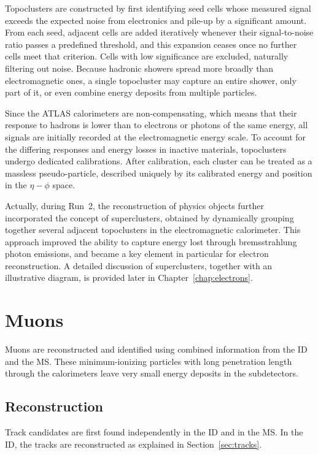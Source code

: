 Topoclusters are constructed by first identifying seed cells whose measured signal exceeds the expected noise from electronics and pile-up by a significant amount. From each seed, adjacent cells are added iteratively whenever their signal-to-noise ratio passes a predefined threshold, and this expansion ceases once no further cells meet that criterion. Cells with low significance are excluded, naturally filtering out noise. Because hadronic showers spread more broadly than electromagnetic ones, a single topocluster may capture an entire shower, only part of it, or even combine energy deposits from multiple particles. 

Since the ATLAS calorimeters are non-compensating, which means that their response to hadrons is lower than to electrons or photons of the same energy, all signals are initially recorded at the electromagnetic energy scale. To account for the differing responses and energy losses in inactive materials, topoclusters undergo dedicated calibrations. After calibration, each cluster can be treated as a massless pseudo-particle, described uniquely by its calibrated energy and position in the $\eta - \phi$ space. 

Actually, during Run~2, the reconstruction of physics objects further incorporated the concept of superclusters, obtained by dynamically grouping together several adjacent topoclusters in the electromagnetic calorimeter. This approach improved the ability to capture energy lost through bremsstrahlung photon emissions, and became a key element in particular for electron reconstruction. A detailed discussion of superclusters, together with an illustrative diagram, is provided later in Chapter~\ref{chap:electrons}.

\section{Muons}
\label{sec:muons}

Muons are reconstructed and identified using combined information from the ID and the MS. These minimum-ionizing particles with long penetration length through the calorimeters leave very small energy deposits in the subdetectors.
\subsection*{Reconstruction} 
Track candidates are first found independently in the ID and in the MS. In the ID, the tracks are reconstructed as explained in Section~\ref{sec:tracks}.

